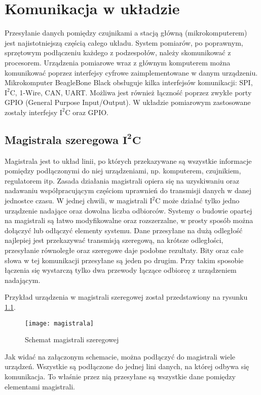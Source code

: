 \chapter{Komunikacja w układzie}

Przesyłanie danych pomiędzy czujnikami a stacją główną (mikrokomputerem) jest najistotniejszą częścią całego układu. System pomiarów, po poprawnym, sprzętowym podłączeniu każdego z podzespołów, należy skomunikować z procesorem. Urządzenia pomiarowe wraz z głównym komputerem można komunikować poprzez interfejsy cyfrowe zaimplementowane w danym urządzeniu. Mikrokomputer BeagleBone Black obsługuje kilka interfejsów komunikacji: SPI, $\mathrm{I^{2}C}$, 1-Wire, CAN, UART. Możliwa jest również łączność poprzez zwykłe porty GPIO (General Purpose Input/Output). W układzie pomiarowym zastosowane zostały interfejsy $\mathrm{I^{2}C}$ oraz GPIO.

\section{Magistrala szeregowa $\mathbf{I^{2}C}$}
Magistrala jest to układ linii, po których przekazywane są wszystkie informacje pomiędzy podłączonymi do niej urządzeniami, np. komputerem, czujnikiem, regulatorem itp. Zasada działania magistrali opiera się na uzyskiwaniu oraz nadawaniu współpracującym częściom uprawnień do transmisji danych w danej jednostce czasu. W jednej chwili, w magistrali $\mathrm{I^{2}C}$ może działać tylko jedno urządzenie nadające oraz dowolna liczba odbiorców. Systemy o budowie opartej na magistrali są łatwo modyfikowalne oraz rozszerzalne, w prosty sposób można dołączyć lub odłączyć elementy systemu.
Dane przesyłane na dużą odległość najlepiej jest przekazywać transmisją szeregową, na krótsze odległości, przesyłanie równoległe oraz szeregowe daje podobne rezultaty.
Bity oraz całe słowa w tej komunikacji przesyłane są jeden po drugim. Przy takim sposobie łączenia się wystarczą tylko dwa przewody łączące odbiorcę z urządzeniem nadającym. 

Przykład urządzenia w magistrali szeregowej został przedstawiony na  rysunku \ref{fig:magistrala}.
\begin{figure}[h]
\centering
\texttt{[image: magistrala]}
\caption{Schemat magistrali szeregowej}
\label{fig:magistrala}
\end{figure}

Jak widać na załączonym schemacie, można podłączyć do magistrali wiele urządzeń. Wszystkie są podłączone do jednej lini danych, na której odbywa się komunikacja. To właśnie przez nią przesyłane są wszystkie dane pomiędzy elementami magistrali.


